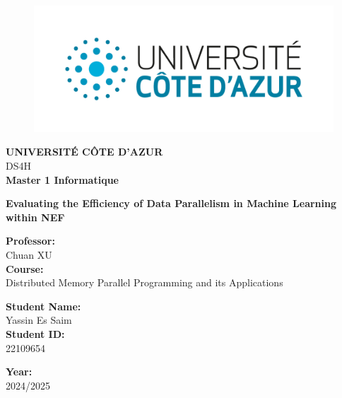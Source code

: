 \begin{titlepage}
\begin{figure}[!htb]
    \centering
    \includegraphics[keepaspectratio=true,scale=0.75]{UCA_logo.png}
\end{figure}

\vspace{2mm}

\begin{center}
    {\LARGE \textbf{UNIVERSITÉ CÔTE D’AZUR}} \\[1mm]
    {\large DS4H} \\[1mm]
    {\LARGE \textbf{Master 1 Informatique}}
\end{center}

\vspace{10mm}

\begin{center}
    {\LARGE \textbf{Evaluating the Efficiency of Data Parallelism in Machine Learning within NEF}}
\end{center}

\vspace{10mm}

\begin{minipage}[t]{0.45\textwidth}
    {\large \textbf{Professor:}} \\[1mm]
    {Chuan XU} \\[2mm]
    {\large \textbf{Course:}} \\[1mm]
    {Distributed Memory Parallel Programming and its Applications}
\end{minipage}
\hfill
\begin{minipage}[t]{0.45\textwidth} \raggedleft
    {\large \textbf{Student Name:}} \\[1mm]
    {Yassin Es Saim} \\[2mm]
    {\large \textbf{Student ID:}} \\[1mm]
    {22109654}
\end{minipage}

\vspace{10mm}

\hrulefill

\vspace{2mm}

\begin{center}
    {\large \textbf{Year:}} \\
    {2024/2025}
\end{center}

\end{titlepage}